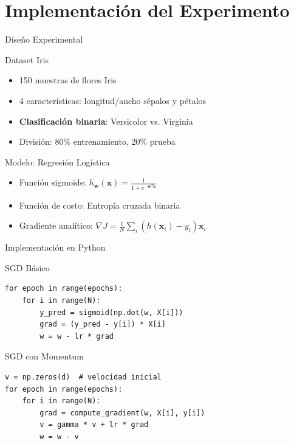 \documentclass[10pt]{beamer}
\begin{document}
\section{Implementación del Experimento}

\begin{frame}{Diseño Experimental}
\begin{block}{Dataset Iris}
\begin{itemize}
\item 150 muestras de flores Iris
\item 4 características: longitud/ancho sépalos y pétalos
\item \textbf{Clasificación binaria}: Versicolor vs. Virginia
\item División: 80\% entrenamiento, 20\% prueba
\end{itemize}
\end{block}

\begin{block}{Modelo: Regresión Logística}
\begin{itemize}
\item Función sigmoide: $h_{\mathbf{w}}(\mathbf{x}) = \frac{1}{1 + e^{-\mathbf{w}^T\mathbf{x}}}$
\item Función de costo: Entropía cruzada binaria
\item Gradiente analítico: $\nabla J = \frac{1}{N}\sum_i (h(\mathbf{x}_i) - y_i)\mathbf{x}_i$
\end{itemize}
\end{block}
\end{frame}

\begin{frame}[fragile]{Implementación en Python}
\begin{block}{SGD Básico}
\begin{verbatim}
for epoch in range(epochs):
    for i in range(N):
        y_pred = sigmoid(np.dot(w, X[i]))
        grad = (y_pred - y[i]) * X[i]
        w = w - lr * grad
\end{verbatim}
\end{block}

\begin{block}{SGD con Momentum}
\begin{verbatim}
v = np.zeros(d)  # velocidad inicial
for epoch in range(epochs):
    for i in range(N):
        grad = compute_gradient(w, X[i], y[i])
        v = gamma * v + lr * grad
        w = w - v
\end{verbatim}
\end{block}
\end{frame}
\end{document}
